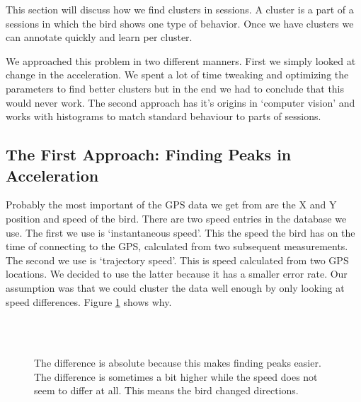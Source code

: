  This section will discuss how we find clusters in sessions. A cluster is a 
part of a sessions in which the bird shows one type of behavior. Once we have
clusters we can annotate quickly and learn per cluster.

We approached this problem in two different manners. First we simply looked at
change in the acceleration. We spent a lot of time tweaking and optimizing the parameters
to find better clusters but in the end we had to conclude that this would never work. 
The second
approach has it's origins in `computer vision' %
and works with histograms to 
match standard behaviour to parts of sessions.

\subsection{The First Approach: Finding Peaks in Acceleration}
 Probably the most important of the GPS data we get from \bits are the X and Y
 position and speed of the bird. There are two speed entries in the database we
 use. The first we use is `instantaneous speed'.    
This the speed the bird has on the time of
 connecting to the GPS, calculated from two subsequent measurements. The second
we use is 
 `trajectory speed'. This is speed calculated from two GPS locations. 
We decided to use the latter because it has a smaller error rate. 
 Our assumption was that we could cluster the data well 
 enough by only looking at speed differences. Figure \ref{fig:speed} shows
 why.

\begin{figure}
  \centering
   \\
   \\
  \caption{The difference is absolute because this makes finding peaks easier. The difference is sometimes a bit higher while the speed does not seem to differ at all. This means the bird changed directions.}
  \label{fig:speed}
\end{figure}

